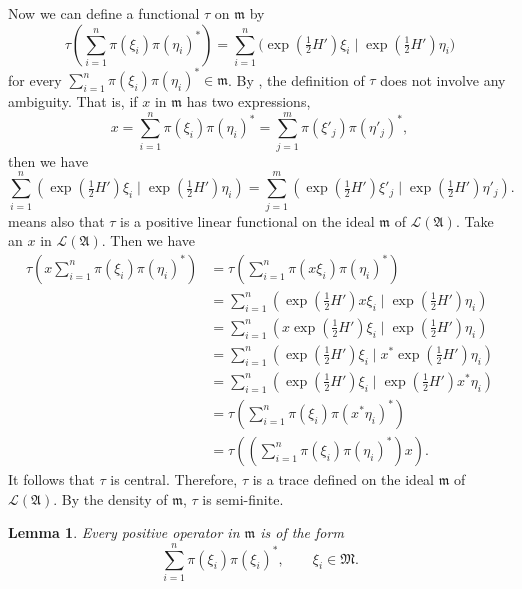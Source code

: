 \documentclass[12pt,b5paper,twoside]{article}
\theoremstyle{takesaki}
\newtheorem{lemma}{Lemma}[section]
\numberwithin{equation}{section}
\begin{document}
Now we can define a functional $\tau$ on $\mathfrak m$ by
\begin{equation}
 \tau\!\left(\sum_{i=1}^{n}\pi(\xi_i)\pi(\eta_i)^*\right)
  =\sum_{i=1}^{n}
   \bigl(\exp(\tfrac12H')\xi_i
      \mid\exp(\tfrac12H')\eta_i\bigr)
 \tag{14.12}\label{eq:14.12}
\end{equation}
for every
$\sum_{i=1}^{n}\pi(\xi_i)\pi(\eta_i)^*\in\mathfrak m$.
By , the definition of $\tau$ does not involve any
ambiguity.  That is, if $x$ in $\mathfrak m$ has two expressions,
\[
 x=\sum_{i=1}^{n}\pi(\xi_i)\pi(\eta_i)^*
  =\sum_{j=1}^{m}\pi(\xi'_j)\pi(\eta'_j)^*,
\]
then we have
\[
 \sum_{i=1}^{n}
  (\exp(\tfrac12H')\xi_i\mid\exp(\tfrac12H')\eta_i)
 =\sum_{j=1}^{m}
  (\exp(\tfrac12H')\xi'_j\mid\exp(\tfrac12H')\eta'_j).
\]
 means also that $\tau$ is a positive linear functional on
the ideal $\mathfrak m$ of $\mathcal L(\mathfrak A)$.  Take an $x$ in
$\mathcal L(\mathfrak A)$.  Then we have
\begin{align*}
 \tau\!\left(x\sum_{i=1}^{n}\pi(\xi_i)\pi(\eta_i)^*\right)
 &=\tau\!\left(\sum_{i=1}^{n}\pi(x\xi_i)\pi(\eta_i)^*\right)\\
 &=\sum_{i=1}^{n}
  (\exp(\tfrac12H')x\xi_i\mid\exp(\tfrac12H')\eta_i)\\
 &=\sum_{i=1}^{n}
  (x\exp(\tfrac12H')\xi_i\mid\exp(\tfrac12H')\eta_i)\\
 &=\sum_{i=1}^{n}
  (\exp(\tfrac12H')\xi_i\mid x^*\exp(\tfrac12H')\eta_i)\\
 &=\sum_{i=1}^{n}
  (\exp(\tfrac12H')\xi_i\mid\exp(\tfrac12H')x^*\eta_i)\\
 &=\tau\!\left(\sum_{i=1}^{n}\pi(\xi_i)\pi(x^*\eta_i)^*\right)\\
 &=\tau\!\left(\left(\sum_{i=1}^{n}
       \pi(\xi_i)\pi(\eta_i)^*\right)x\right).
\end{align*}
It follows that $\tau$ is central.  Therefore, $\tau$ is a trace
defined on the ideal $\mathfrak m$ of $\mathcal L(\mathfrak A)$.  By
the density of $\mathfrak m$, $\tau$ is semi-finite.

\begin{lemma}\label{lem:14.4}
Every positive operator in $\mathfrak m$ is of the form
\[
  \sum_{i=1}^{n}\pi(\xi_i)\pi(\xi_i)^*,
  \qquad \xi_i\in\mathfrak M.
\]
\end{lemma}
\end{document}
